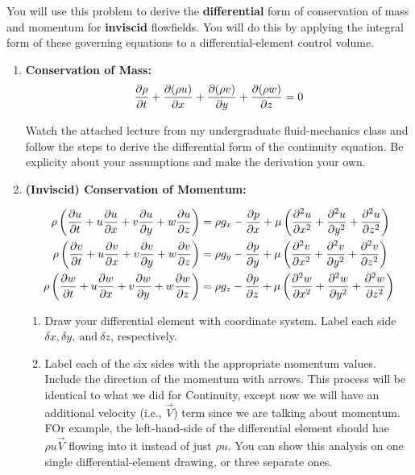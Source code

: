 \documentclass[../main.tex]{subfiles}
\begin{document}

You will use this problem to derive the \textbf{differential} form of conservation of mass and momentum for \textbf{inviscid} flowfields.
You will do this by applying the integral form of these governing equations to a differential-element control volume.

\begin{enumerate}[label = (\alph*)]

    \item \textbf{Conservation of Mass:}
        \[
            \pdv{\rho}{t} + \pdv{(\rho u)}{x} + \pdv{(\rho v)}{y} + \pdv{(\rho w)}{z} = 0
        \]

        Watch the attached lecture from my undergraduate fluid-mechanics class and follow the steps to derive the differential form of the continuity equation.
        Be explicity about your assumptions and make the derivation your own.

    \item \textbf{(Inviscid) Conservation of Momentum:}
    
        \begin{align*}
            \rho \left({\pdv{u}{t} + u \pdv{u}{x} + v \pdv{u}{y} + w \pdv{u}{z}}\right) &= \rho g_x - \pdv{p}{x} + \mu \left({\pdv[2]{u}{x} + \pdv[2]{u}{y} + \pdv[2]{u}{z}}\right)\\
            \rho \left({\pdv{v}{t} + u \pdv{v}{x} + v \pdv{v}{y} + w \pdv{v}{z}}\right) &= \rho g_y - \pdv{p}{y} + \mu \left({\pdv[2]{v}{x} + \pdv[2]{v}{y} + \pdv[2]{v}{z}}\right)\\
            \rho \left({\pdv{w}{t} + u \pdv{w}{x} + v \pdv{w}{y} + w \pdv{w}{z}}\right) &= \rho g_z - \pdv{p}{z} + \mu \left({\pdv[2]{w}{x} + \pdv[2]{w}{y} + \pdv[2]{w}{z}}\right)\\
        \end{align*}

    \begin{enumerate}[label = (b\arabic*)]

        \item 
            Draw your differential element with coordinate system.
            Label each side \(\delta x, \delta y, \ \textrm{and} \ \delta z\), respectively.

        \item
            Label each of the six sides with the appropriate momentum values.
            Include the direction of the momentum with arrows.
            This process will be identical to what we did for Continuity, except now we will have an additional velocity (i.e., \(\vec{V}\)) term since we are talking about momentum.
            FOr example, the left-hand-side of the differential element should hae \(\rho u \vec{V}\) flowing into it instead of just \(\rho u\).
            You can show this analysis on one single differential-element drawing, or three separate ones.


\end{enumerate}
\end{enumerate}
\end{document}
